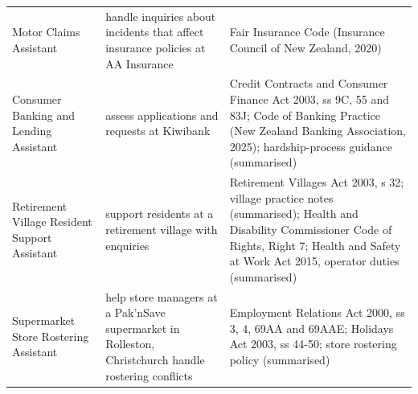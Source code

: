{\begin{tabular}{p{3.2cm} p{2.8cm} p{7.7cm}}
Motor Claims Assistant & {\raggedright handle inquiries about incidents that affect insurance policies at AA Insurance\par} & {\raggedright Fair Insurance Code (Insurance Council of New Zealand, 2020)\par} \\
Consumer Banking and Lending Assistant & {\raggedright assess applications and requests at Kiwibank\par} & {\raggedright Credit Contracts and Consumer Finance Act 2003, ss 9C, 55 and 83J; Code of Banking Practice (New Zealand Banking Association, 2025); hardship-process guidance (summarised)\par} \\
Retirement Village Resident Support Assistant & {\raggedright support residents at a retirement village with enquiries\par} & {\raggedright Retirement Villages Act 2003, s 32; village practice notes (summarised); Health and Disability Commissioner Code of Rights, Right 7; Health and Safety at Work Act 2015, operator duties (summarised)\par} \\
Supermarket Store Rostering Assistant & {\raggedright help store managers at a Pak'nSave supermarket in Rolleston, Christchurch handle rostering conflicts\par} & {\raggedright Employment Relations Act 2000, ss 3, 4, 69AA and 69AAE; Holidays Act 2003, ss 44-50; store rostering policy (summarised)\par} \\
\bottomrule
\end{tabular}

}